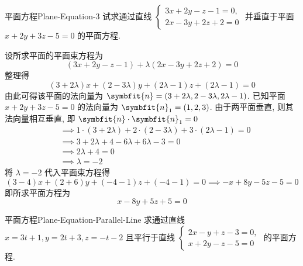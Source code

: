 \begin{problem}{平面方程}{Plane-Equation-3}
    试求通过直线 $\begin{cases} 3x + 2y - z - 1 = 0, \\ 2x - 3y + 2z + 2 = 0 \end{cases}$ 并垂直于平面 $x + 2y + 3z - 5 = 0$ 的平面方程.
\end{problem}

\begin{solution}
    设所求平面的平面束方程为
    \begin{equation*}
        (3x + 2y - z - 1) + \lambda(2x - 3y + 2z + 2) = 0
    \end{equation*}
    整理得
    \begin{equation*}
        (3 + 2\lambda)x + (2 - 3\lambda)y + (2\lambda - 1)z + (2\lambda - 1) = 0
    \end{equation*}
    由此可得该平面的法向量为 $\symbfit{n} = (3 + 2\lambda, 2 - 3\lambda, 2\lambda - 1)$.
    已知平面 $x + 2y + 3z - 5 = 0$ 的法向量为 $\symbfit{n}_1 = (1, 2, 3)$.
    由于两平面垂直, 则其法向量相互垂直, 即 $\symbfit{n} \cdot \symbfit{n}_1 = 0$
    \begin{equation*}
        \begin{aligned}
             & \implies 1 \cdot (3 + 2\lambda) + 2 \cdot (2 - 3\lambda) + 3 \cdot (2\lambda - 1) = 0 \\
             & \implies 3 + 2\lambda + 4 - 6\lambda + 6\lambda - 3 = 0                               \\
             & \implies 2\lambda + 4 = 0                                                             \\
             & \implies \lambda = -2
        \end{aligned}
    \end{equation*}
    将 $\lambda = -2$ 代入平面束方程得
    \begin{equation*}
        (3 - 4)x + (2 + 6)y + (-4 - 1)z + (-4 - 1) = 0 \implies -x + 8y - 5z - 5 = 0
    \end{equation*}
    即所求平面方程为
    \begin{equation*}
        \boxed{x - 8y + 5z + 5 = 0}
    \end{equation*}
\end{solution}


\begin{problem}{平面方程}{Plane-Equation-Parallel-Line}
    求通过直线 $x = 3t+1, y = 2t+3, z = -t-2$ 且平行于直线 $\begin{cases} 2x - y + z - 3 = 0, \\ x + 2y - z - 5 = 0 \end{cases}$ 的平面方程.
\end{problem}

